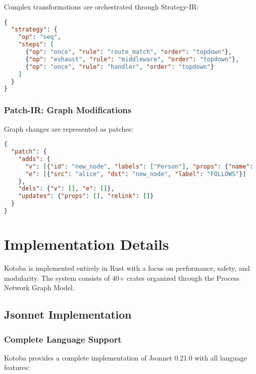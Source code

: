 \documentclass[11pt,a4paper]{article}
\begin{document}
Complex transformations are orchestrated through Strategy-IR:

\begin{lstlisting}[language=json,caption=Strategy-IR example]
{
  "strategy": {
    "op": "seq",
    "steps": [
      {"op": "once", "rule": "route_match", "order": "topdown"},
      {"op": "exhaust", "rule": "middleware", "order": "topdown"},
      {"op": "once", "rule": "handler", "order": "topdown"}
    ]
  }
}
\end{lstlisting}

\subsubsection{Patch-IR: Graph Modifications}
\label{subsubsec:patch_ir}

Graph changes are represented as patches:

\begin{lstlisting}[language=json,caption=Patch-IR example]
{
  "patch": {
    "adds": {
      "v": [{"id": "new_node", "labels": ["Person"], "props": {"name": "Charlie"}}],
      "e": [{"src": "alice", "dst": "new_node", "label": "FOLLOWS"}]
    },
    "dels": {"v": [], "e": []},
    "updates": {"props": [], "relink": []}
  }
}
\end{lstlisting}

\section{Implementation Details}
\label{sec:implementation}

Kotoba is implemented entirely in Rust with a focus on performance, safety, and modularity. The system consists of 40+ crates organized through the Process Network Graph Model.

\subsection{Jsonnet Implementation}
\label{subsec:jsonnet_impl}

\subsubsection{Complete Language Support}
\label{subsubsec:jsonnet_features}

Kotoba provides a complete implementation of Jsonnet 0.21.0 with all language features:
\end{document}
